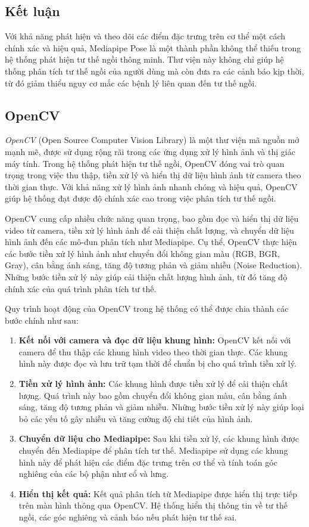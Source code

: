 \documentclass[conference]{IEEEtran}
\begin{document}
\subsection{Kết luận}
Với khả năng phát hiện và theo dõi các điểm đặc trưng trên cơ thể một cách chính xác và hiệu quả, Mediapipe Pose là một thành phần không thể thiếu trong hệ thống phát hiện tư thế ngồi thông minh. Thư viện này không chỉ giúp hệ thống phân tích tư thế ngồi của người dùng mà còn đưa ra các cảnh báo kịp thời, từ đó giảm thiểu nguy cơ mắc các bệnh lý liên quan đến tư thế ngồi.

\subsection{OpenCV}
\textit{OpenCV} (Open Source Computer Vision Library) là một thư viện mã nguồn mở mạnh mẽ, được sử dụng rộng rãi trong các ứng dụng xử lý hình ảnh và thị giác máy tính. Trong hệ thống phát hiện tư thế ngồi, OpenCV đóng vai trò quan trọng trong việc thu thập, tiền xử lý và hiển thị dữ liệu hình ảnh từ camera theo thời gian thực. Với khả năng xử lý hình ảnh nhanh chóng và hiệu quả, OpenCV giúp hệ thống đạt được độ chính xác cao trong việc phân tích tư thế ngồi.

OpenCV cung cấp nhiều chức năng quan trọng, bao gồm đọc và hiển thị dữ liệu video từ camera, tiền xử lý hình ảnh để cải thiện chất lượng, và chuyển dữ liệu hình ảnh đến các mô-đun phân tích như Mediapipe. Cụ thể, OpenCV thực hiện các bước tiền xử lý hình ảnh như chuyển đổi không gian màu (RGB, BGR, Gray), cân bằng ánh sáng, tăng độ tương phản và giảm nhiễu (Noise Reduction). Những bước tiền xử lý này giúp cải thiện chất lượng hình ảnh, từ đó tăng độ chính xác của quá trình phân tích tư thế.

Quy trình hoạt động của OpenCV trong hệ thống có thể được chia thành các bước chính như sau:

\begin{enumerate}
    \item \textbf{Kết nối với camera và đọc dữ liệu khung hình:} OpenCV kết nối với camera để thu thập các khung hình video theo thời gian thực. Các khung hình này được đọc và lưu trữ tạm thời để chuẩn bị cho quá trình tiền xử lý.
    \item \textbf{Tiền xử lý hình ảnh:} Các khung hình được tiền xử lý để cải thiện chất lượng. Quá trình này bao gồm chuyển đổi không gian màu, cân bằng ánh sáng, tăng độ tương phản và giảm nhiễu. Những bước tiền xử lý này giúp loại bỏ các yếu tố gây nhiễu và tăng cường độ chi tiết của hình ảnh.
    \item \textbf{Chuyển dữ liệu cho Mediapipe:} Sau khi tiền xử lý, các khung hình được chuyển đến Mediapipe để phân tích tư thế. Mediapipe sử dụng các khung hình này để phát hiện các điểm đặc trưng trên cơ thể và tính toán góc nghiêng của các bộ phận như cổ và lưng.
    \item \textbf{Hiển thị kết quả:} Kết quả phân tích từ Mediapipe được hiển thị trực tiếp trên màn hình thông qua OpenCV. Hệ thống hiển thị thông tin về tư thế ngồi, các góc nghiêng và cảnh báo nếu phát hiện tư thế sai.
\end{enumerate}
\end{document}
